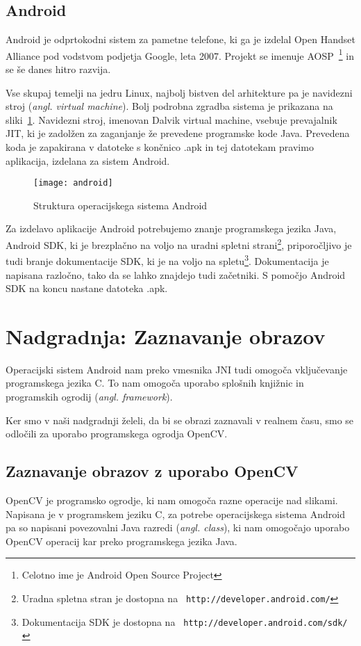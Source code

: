 \section{Android}
Android je odprtokodni sistem za pametne telefone, ki ga je izdelal Open
Handset Alliance pod vodstvom podjetja Google, leta 2007. Projekt se imenuje
AOSP~\footnote{Celotno ime je Android Open Source Project} in se še danes
hitro razvija.

Vse skupaj temelji na jedru Linux, najbolj bistven del arhitekture pa je
navidezni stroj (\textit{angl. virtual machine}). Bolj podrobna zgradba
sistema je prikazana na sliki~\ref{picAndroid}. Navidezni stroj, imenovan
Dalvik virtual machine, vsebuje prevajalnik JIT, ki je zadolžen za zaganjanje
že prevedene programske kode Java. Prevedena koda je zapakirana v datoteke s
končnico .apk in tej datotekam pravimo aplikacija, izdelana za sistem Android.

\begin{figure}
    \centering
    \texttt{[image: android]}
    \caption{Struktura operacijskega sistema Android~\cite{wiki:Android}}
    \label{picAndroid}
\end{figure}

Za izdelavo aplikacije Android potrebujemo znanje programskega jezika Java,
Android SDK, ki je brezplačno na voljo na uradni spletni
strani\footnote{Uradna spletna stran je dostopna na {\tt
http://developer.android.com/}}, priporočljivo je tudi branje dokumentacije
SDK, ki je na voljo na spletu\footnote{Dokumentacija SDK je dostopna na {\tt
http://developer.android.com/sdk/}}. Dokumentacija je napisana razločno, tako
da se lahko znajdejo tudi začetniki. S pomočjo Android SDK na koncu nastane
datoteka .apk.

\chapter{Nadgradnja: Zaznavanje obrazov}
Operacijski sistem Android nam preko vmesnika JNI tudi omogoča vključevanje programskega jezika C. To nam omogoča uporabo splošnih knjižnic in programskih ogrodij (\textit{angl. framework}).

Ker smo v naši nadgradnji želeli, da bi se obrazi zaznavali v realnem času, smo se odločili za uporabo programskega ogrodja OpenCV.

\section{Zaznavanje obrazov z uporabo OpenCV}
OpenCV je programsko ogrodje, ki nam omogoča razne operacije nad slikami.
Napisana je v programskem jeziku C, za potrebe operacijskega sistema Android
pa so napisani povezovalni Java razredi (\textit{angl. class}), ki nam
omogočajo uporabo OpenCV operacij kar preko programskega jezika Java.

